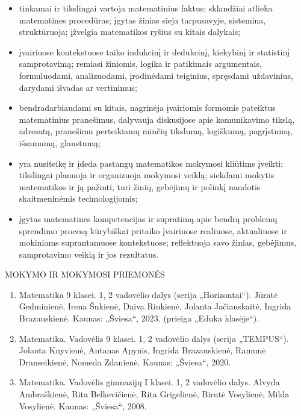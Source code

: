 \documentclass[11pt,a4paper]{article}
\newcommand{\DocHeading}[1]{%
  \vspace{0.75\baselineskip}%
  {\large #1}\par
  \vspace{0.15\baselineskip}%
}
\begin{document}
\begin{itemize}

  \item tinkamai ir tikslingai vartoja matematinius faktus; sklandžiai
  atlieka matematines procedūras; įgytas žinias sieja tarpusavyje,
  sistemina, struktūruoja; įžvelgia matematikos ryšius su kitais
  dalykais;

  \item įvairiuose kontekstuose taiko indukcinį ir dedukcinį,
  kiekybinį ir statistinį samprotavimą; remiasi žiniomis, logika ir
  patikimais argumentais, formuluodami, analizuodami, įrodinėdami
  teiginius, spręsdami uždavinius, darydami išvadas ar vertinimus;

  \item bendradarbiaudami su kitais, nagrinėja įvairiomis formomis
  pateiktus matematinius pranešimus, dalyvauja diskusijose apie
  komunikavimo tikslą, adresatą, pranešimu perteikiamų minčių
  tikslumą, logiškumą, pagrįstumą, išsamumą, glaustumą;

  \item yra nusiteikę ir įdeda pastangų matematikos mokymosi kliūtims
  įveikti; tikslingai planuoja ir organizuoja mokymosi veiklą;
  siekdami mokytis matematikos ir ją pažinti, turi žinių, gebėjimų ir
  polinkį naudotis skaitmeninėmis technologijomis;

  \item įgytas matematines kompetencijas ir supratimą apie bendrą
  problemų sprendimo procesą kūrybiškai pritaiko įvairiuose realiuose,
  aktualiuose ir mokiniams suprantamuose kontekstuose; reflektuoja
  savo žinias, gebėjimus, samprotavimo veiklą ir jos rezultatus.

\end{itemize}

\DocHeading{MOKYMO IR MOKYMOSI PRIEMONĖS}

\begin{enumerate}

  \item Matematika 9 klasei. 1, 2 vadovėlio dalys
  (serija „Horizontai“). Jūratė Gedminienė, Irena Šukienė,
  Daiva Riukienė, Jolanta Jačiauskaitė, Ingrida Brazauskienė.
  Kaunas: „Šviesa“, 2023. (prieiga „Eduka klasėje“).

  \item Matematika. Vadovėlis 9 klasei. 1, 2 vadovėlio dalys
  (serija „TEMPUS“). Jolanta Knyvienė, Antanas Apynis,
  Ingrida Brazauskienė, Ramunė Dranseikienė, Nomeda Zdanienė.
  Kaunas: „Šviesa“, 2020.

  \item Matematika. Vadovėlis gimnazijų I klasei.
  1, 2 vadovėlio dalys. Alvyda Ambraškienė, Rita Belkevičienė,
  Rita Grigelienė, Birutė Vosylienė, Milda Vosylienė.
  Kaunas: „Šviesa“, 2008.

\end{enumerate}
\end{document}
